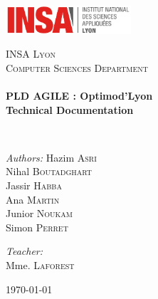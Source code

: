 \begin{titlepage}
\begin{center}

\includegraphics[width=0.35\textwidth]{./logo}~\\[2cm]

\vspace{3cm}

\textsc{\LARGE INSA Lyon}\\[0.5cm]
\textsc{\Large Computer Sciences Department}\\[0.5cm]

\HRule \\[0.4cm]

{\huge \bfseries PLD AGILE : Optimod'Lyon\\
Technical Documentation\\[0.4cm] }

\HRule \\[1.5cm]

\begin{minipage}{0.4\textwidth}
\begin{flushleft} \large
\emph{Authors:}
Hazim \textsc{Asri}\\
Nihal \textsc{Boutadghart}\\
Jassir \textsc{Habba}\\
Ana \textsc{Martin}\\
Junior \textsc{Noukam}\\
Simon \textsc{Perret}\\
\end{flushleft}
\end{minipage}
\begin{minipage}{0.4\textwidth}
\begin{flushright} \large
\emph{Teacher:} \\
Mme. \textsc{Laforest}\\
\end{flushright}
\end{minipage}

\vfill

{\large \today}

\end{center}
\end{titlepage}